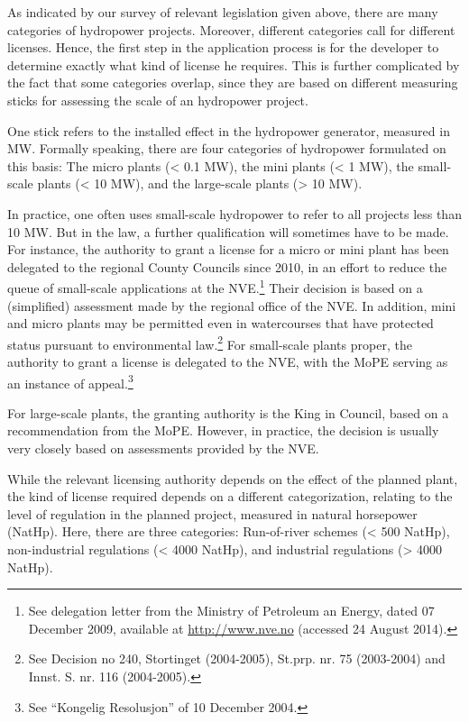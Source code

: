 As indicated by our survey of relevant legislation given above, there are many categories of hydropower projects. Moreover, different categories call for different licenses. Hence, the first step in the application process is for the developer to determine exactly what kind of license he requires. This is further complicated by the fact that some categories overlap, since they are based on different measuring sticks for assessing the scale of an hydropower project. 

One stick refers to the installed effect in the hydropower generator, measured in MW. Formally speaking, there are four categories of hydropower formulated on this basis: The micro plants (< 0.1 MW), the mini plants (< 1 MW), the small-scale plants (< 10 MW), and the large-scale plants (> 10 MW). 

In practice, one often uses small-scale hydropower to refer to all projects less than 10 MW. But in the law, a further qualification will sometimes have to be made. For instance, the authority to grant a license for a micro or mini plant has been delegated to the regional County Councils since 2010, in an effort to reduce the queue of small-scale applications at the NVE.\footnote{See delegation letter from the Ministry of Petroleum an Energy, dated 07 December 2009, available at \url{http://www.nve.no} (accessed 24 August 2014).} Their decision is based on a (simplified) assessment made by the regional office of the NVE. In addition, mini and micro plants may be permitted even in watercourses that have protected status pursuant to environmental law.\footnote{See Decision no 240, Stortinget (2004-2005), St.prp. nr. 75 (2003-2004) and Innst. S. nr. 116 (2004-2005).}  For small-scale plants proper, the authority to grant a license is delegated to the NVE, with the MoPE serving as an instance of appeal.\footnote{See ``Kongelig Resolusjon'' of 10 December 2004.}

 For large-scale plants, the granting authority is the King in Council, based on a recommendation from the MoPE. However, in practice, the decision is usually very closely based on assessments provided by the NVE.

While the relevant licensing authority depends on the effect of the planned plant, the kind of license required depends on a different categorization, relating to the level of regulation in the planned project, measured in natural horsepower (NatHp). Here, there are three categories: Run-of-river schemes  (< 500 NatHp), non-industrial regulations (< 4000 NatHp), and industrial regulations (> 4000 NatHp). %

